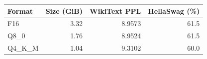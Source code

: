 \begin{tabular}{lrrr}
\toprule
Format & Size (GiB) & WikiText PPL & HellaSwag (\%) \\
\midrule
F16 & 3.32 & 8.9573 & 61.5 \\
Q8\_0 & 1.76 & 8.9524 & 61.5 \\
Q4\_K\_M & 1.04 & 9.3102 & 60.0 \\
\bottomrule
\end{tabular}
